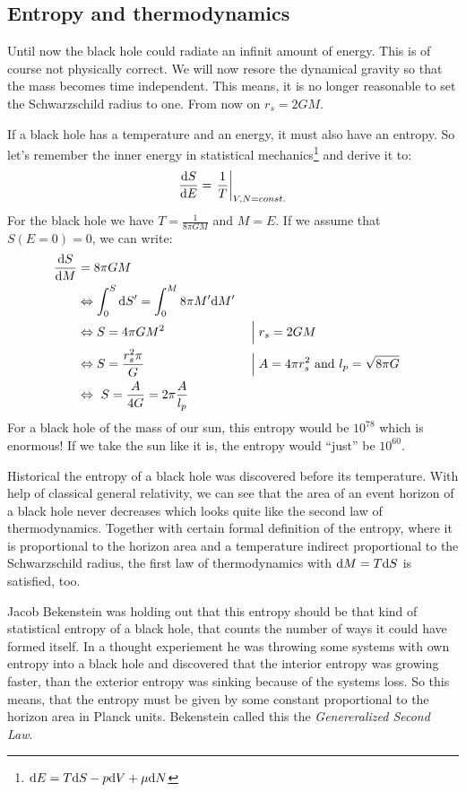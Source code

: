 \subsection{Entropy and thermodynamics \checkmark}
	Until now the black hole could radiate an infinit amount of energy. This is of course not physically correct. We will now resore the dynamical gravity so that the mass becomes time independent. This means, it is no longer reasonable to set the Schwarzschild radius to one. From now on $r_s= 2GM$.	
	
	If a black hole has a temperature and an energy, it must also have an entropy. So let's remember the inner energy in statistical mechanics\footnote{$\mathrm{d} E = 
	T \mathrm{d} S - p \mathrm{d} V + \mu \mathrm{d} N$} and derive it to:
		\begin{equation}
			\frac{\mathrm{d} S}{\mathrm{d} E} = \left. \frac{1}{T} \right|_{V,N=const.}
		\end{equation}
	For the black hole we have $T = \frac{1}{8 \pi G M}$ and $M=E$. If we assume that $S(E=0) = 0$, we can write:
		\begin{align}
			\frac{\mathrm{d} S}{\mathrm{d} M} &= 8 \pi G M \nonumber \\
			&\Leftrightarrow \int_0^S \mathrm{d} S' = \int_0^M 8 \pi M' \mathrm{d} M' \nonumber\\
			&\Leftrightarrow S = 4 \pi G M^2 & & \Bigm| r_s = 2GM \nonumber\\
			&\Leftrightarrow S = \frac{r_s^2 \pi}{G}  & & \Bigm| A=4 \pi r_s^2 \text{~and~} l_p = \sqrt{8 \pi G} \nonumber\\
			&\Leftrightarrow~
			S = \frac{A}{4G} = 2 \pi \frac{A}{l_p} \label{entropy}
		\end{align}
	For a black hole of the mass of our sun, this entropy would be $10^{78}$ which is enormous! If we take the sun like it is, the entropy would ``just'' be $10^{60}$. 
	
	Historical the entropy of a black hole was discovered before its temperature. With help of classical general relativity, we can see that the area of an event horizon of a black hole never decreases which looks quite like the second law of thermodynamics. Together with certain formal definition of the entropy, where it is proportional to the horizon area and a temperature indirect proportional to the Schwarzschild radius, the first law of thermodynamics with $\mathrm{d} M = T \mathrm{d} S$ is satisfied, too. 
	
	Jacob Bekenstein was holding out that this entropy should be that kind of statistical entropy of a black hole, that counts the number of ways it could have formed itself. 
	In a thought experiement he was throwing some systems with own entropy into a black hole and discovered that the interior entropy was growing faster, than the exterior entropy was sinking because of the systems loss. 
	So this means, that the entropy must be given by some constant proportional to the horizon area in Planck units.
	Bekenstein called this the \textit{Genereralized Second Law}.
	
